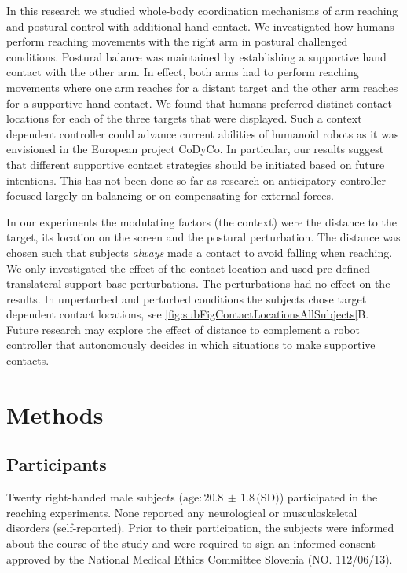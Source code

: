 In this research we studied whole-body coordination mechanisms of arm reaching 
and postural control with additional hand contact. We investigated how humans 
perform reaching movements with the right arm in postural challenged conditions. 
Postural balance was maintained by establishing a supportive hand contact with 
the other arm. In effect, both arms had to perform reaching movements where one 
arm reaches for a distant target and the other arm reaches for a supportive hand 
contact. We found that humans preferred distinct contact locations for each of 
the three targets that were displayed. Such a context dependent controller could 
advance current abilities of humanoid robots as it was envisioned in the 
European project CoDyCo\cite{codyco}. In particular, our results suggest that 
different supportive contact strategies should be initiated based on future intentions. 
This has not been done so far as research on anticipatory controller 
 focused largely on balancing\cite{sugihara2002whole, rueckert2014robust, tassa2012synthesis} or 
 on compensating for external forces\cite{atkeson2007multiple, hyon2007full, ruckert2011study, toussaint2014dual}. 

In our experiments the modulating factors (the context) were the distance to the 
target,  its location on the screen and the postural perturbation. The distance 
was chosen such that subjects \textit{always} made a contact to avoid falling 
when reaching. We only investigated the effect of the contact location and used 
pre-defined translateral support base perturbations. The perturbations had no 
effect on the results. In unperturbed and perturbed conditions the subjects 
chose target dependent contact locations, see \FigureAbbr 
\ref{fig:subFigContactLocationsAllSubjects}B. Future research may explore the 
effect of distance to complement a robot controller that autonomously decides in 
which situations to make supportive contacts. 


\section{Methods}%

\subsection{Participants}

Twenty right-handed male subjects ($\textrm{age:} \, 20.8 \, \pm  \, 1.8 \,
\textrm{(SD)}$) participated in the reaching experiments. None reported any neurological or musculoskeletal
disorders (self-reported). Prior to their participation, the subjects were
informed about the course of the study and were required to sign an informed
consent approved by the National Medical Ethics Committee Slovenia (NO. 112/06/13).

